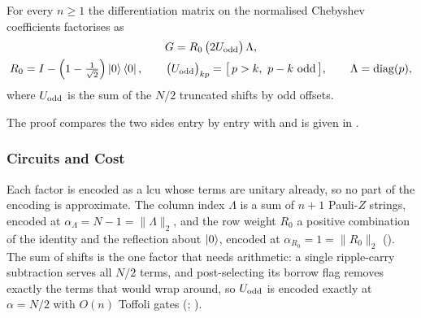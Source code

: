 \begin{proposition}
\label{prop:G-factorisation}
For every $n \ge 1$ the differentiation matrix on the normalised Chebyshev coefficients factorises as
\begin{equation}
    \begin{gathered}
        \G = R_0\,\bigl(2\Uodd\bigr)\,\Lambda, \\
        R_0 = I - \Bigl(1 - \tfrac{1}{\sqrt2}\Bigr)\ket{0}\bra{0},
        \qquad
        \bigl(\Uodd\bigr)_{kp} = \bigl[\,p > k,\ p - k\ \text{odd}\,\bigr],
        \qquad
        \Lambda = \operatorname{diag}(p) ,
    \end{gathered}
    \label{eq:G-structured}
\end{equation}
where $U_{\mathrm{odd}}$ is the sum of the $N/2$ truncated shifts by odd offsets.
\end{proposition}
The proof compares the two sides entry by entry with  and is given in .

\subsubsection{Circuits and Cost}
\label{sec:standard-cost}

Each factor is encoded as a \gls{lcu} \cite{childs2012lcu} whose terms are unitary already, so no part of the encoding is approximate. The column index $\Lambda$ is a sum of $n+1$ Pauli-$Z$ strings, encoded at $\alpha_\Lambda=N-1=\|\Lambda\|_2$, and the row weight $R_0$ a positive combination of the identity and the reflection about $\ket{0}$, encoded at $\alpha_{R_0}=1=\|R_0\|_2$ (). The sum of shifts is the one factor that needs arithmetic: a single ripple-carry subtraction \cite{cuccaro2004adder} serves all $N/2$ terms, and post-selecting its borrow flag removes exactly the terms that would wrap around, so $U_{\mathrm{odd}}$ is encoded exactly at $\alpha=N/2$ with $O(n)$ Toffoli gates (; ).


